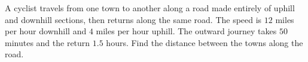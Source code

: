 A cyclist travels from one town to another along a road made entirely of uphill and downhill sections, then returns along the same road. The speed is $12$ miles per hour downhill and $4$ miles per hour uphill. The outward journey takes $50$ minutes and the return $1.5$ hours. Find the distance between the towns along the road.
